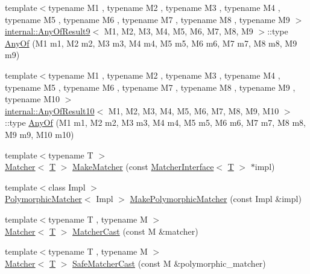 \begin{DoxyCompactItemize}
\item 
{\footnotesize template$<$typename M1 , typename M2 , typename M3 , typename M4 , typename M5 , typename M6 , typename M7 , typename M8 , typename M9 $>$ }\\\hyperlink{structtesting_1_1internal_1_1_any_of_result9}{internal\+::\+Any\+Of\+Result9}$<$ M1, M2, M3, M4, M5, M6, M7, M8, M9 $>$\+::type \hyperlink{namespacetesting_a873c812db953aebd4bf2ffbff0e8d770}{Any\+Of} (M1 m1, M2 m2, M3 m3, M4 m4, M5 m5, M6 m6, M7 m7, M8 m8, M9 m9)
\item 
{\footnotesize template$<$typename M1 , typename M2 , typename M3 , typename M4 , typename M5 , typename M6 , typename M7 , typename M8 , typename M9 , typename M10 $>$ }\\\hyperlink{structtesting_1_1internal_1_1_any_of_result10}{internal\+::\+Any\+Of\+Result10}$<$ M1, M2, M3, M4, M5, M6, M7, M8, M9, M10 $>$\+::type \hyperlink{namespacetesting_a1797921d3ed04c7f13dfa8f36bf0bf1c}{Any\+Of} (M1 m1, M2 m2, M3 m3, M4 m4, M5 m5, M6 m6, M7 m7, M8 m8, M9 m9, M10 m10)
\item 
{\footnotesize template$<$typename T $>$ }\\\hyperlink{classtesting_1_1_matcher}{Matcher}$<$ \hyperlink{functions__7_8js_adf1f3edb9115acb0a1e04209b7a9937b}{T} $>$ \hyperlink{namespacetesting_a37fd8029ac00e60952440a3d9cca8166}{Make\+Matcher} (const \hyperlink{classtesting_1_1_matcher_interface}{Matcher\+Interface}$<$ \hyperlink{functions__7_8js_adf1f3edb9115acb0a1e04209b7a9937b}{T} $>$ $\ast$impl)
\item 
{\footnotesize template$<$class Impl $>$ }\\\hyperlink{classtesting_1_1_polymorphic_matcher}{Polymorphic\+Matcher}$<$ Impl $>$ \hyperlink{namespacetesting_a667ca94f190ec2e17ee2fbfdb7d3da04}{Make\+Polymorphic\+Matcher} (const Impl \&impl)
\item 
{\footnotesize template$<$typename T , typename M $>$ }\\\hyperlink{classtesting_1_1_matcher}{Matcher}$<$ \hyperlink{functions__7_8js_adf1f3edb9115acb0a1e04209b7a9937b}{T} $>$ \hyperlink{namespacetesting_a8234d15eee99b135a7fdf2141a2ebe1f}{Matcher\+Cast} (const M \&matcher)
\item 
{\footnotesize template$<$typename T , typename M $>$ }\\\hyperlink{classtesting_1_1_matcher}{Matcher}$<$ \hyperlink{functions__7_8js_adf1f3edb9115acb0a1e04209b7a9937b}{T} $>$ \hyperlink{namespacetesting_ac016ac22aa065a19b9ef95f0ccffc17b}{Safe\+Matcher\+Cast} (const M \&polymorphic\+\_\+matcher)

\end{DoxyCompactItemize}

